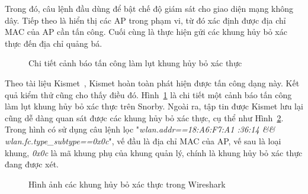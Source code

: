 Trong đó, câu lệnh đầu dùng để bật chế độ giám sát cho giao diện mạng không dây. Tiếp theo là hiển thị các AP trong phạm vi, từ đó xác định được địa chỉ MAC của AP cần tấn công. Cuối cùng là thực hiện gửi các khung hủy bỏ xác thực đến địa chỉ quảng bá.

\begin{figure}[H]
    \centering
    \caption{
        \label{fig:deauth-snorby}
        Chi tiết cảnh báo tấn công làm lụt khung hủy bỏ xác thực}
\end{figure}

Theo tài liệu Kismet~\cite{mike2016kismet}, Kismet hoàn toàn phát hiện được tấn công dạng này. Kết quả kiểm thử cũng cho thấy điều đó. Hình~\ref{fig:deauth-snorby} là chi tiết một cảnh báo tấn công làm lụt khung hủy bỏ xác thực trên Snorby. Ngoài ra, tập tin được Kismet lưu lại cũng dễ dàng quan sát được các khung hủy bỏ xác thực, cụ thể như Hình~\ref{fig:deauth-wireshark}. Trong hình có sử dụng câu lệnh lọc "\emph{wlan.addr==18:A6:F7:A1 :36:14 \&\& wlan.fc.type\_subtype==0x0c}", vế đầu là địa chỉ MAC của AP, vế sau là loại khung, \emph{0x0c} là mã khung phụ của khung quản lý, chính là khung hủy bỏ xác thực đang được xét.

\begin{figure}[H]
    \centering
    \caption{
        \label{fig:deauth-wireshark}
        Hình ảnh các khung hủy bỏ xác thực trong Wireshark}
\end{figure}

